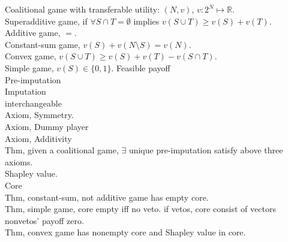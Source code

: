 \documentclass[paper=a4, fontsize=11pt]{scrartcl} %
\numberwithin{equation}{section} %
\numberwithin{figure}{section} %
\numberwithin{table}{section} %
\begin{document}
Coalitional game with transferable utility: $(N,v)$, $v:2^N\mapsto \mathbb{R}$.\\
Superadditive game, if $\forall S\cap T=\emptyset$ implies $v(S\cup T)\geq v(S)+v(T)$.\\
Additive game, $=$.\\
Constant-sum game, $v(S)+v(N\setminus S)=v(N)$.\\
Convex game, $v(S\cup T)\geq v(S)+v(T)-v(S\cap T)$.\\
Simple game, $v(S)\in \{0,1\}$.
Feasible payoff\\
Pre-imputation\\
Imputation\\
interchangeable\\
Axiom, Symmetry.\\
Axiom, Dummy player\\
Axiom, Additivity\\
%
Thm, given a coalitional game, $\exists$ unique pre-imputation satisfy above three axioms.\\
Shapley value.\\
Core\\
Thm, constant-sum, not additive game has empty core.\\
Thm, simple game, core empty iff no veto. if vetos, core consist of vectors nonvetos' payoff zero.\\
Thm, convex game has nonempty core and Shapley value in core.
\end{document}
